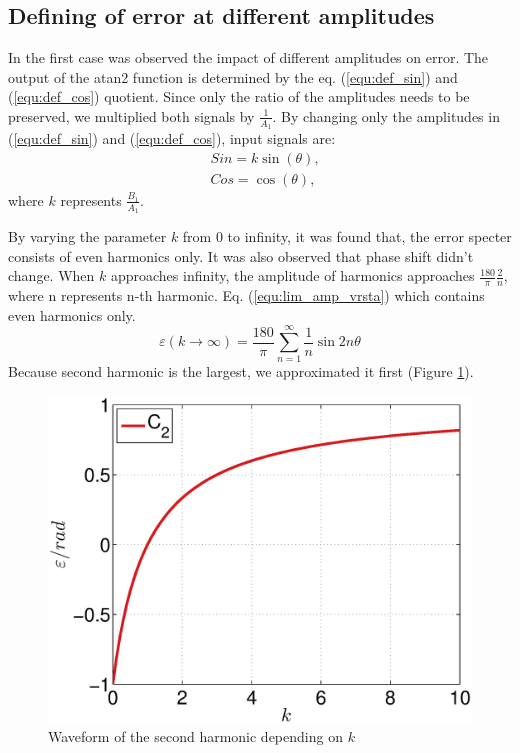 \documentclass[a4paper]{article}
\begin{document}
\subsection{Defining of error at different amplitudes}
In the first case was observed the impact of different amplitudes on error. The output of the atan2 function is determined by the eq. (\ref{equ:def_sin}) and (\ref{equ:def_cos}) quotient. Since only the ratio of the amplitudes needs to be preserved, we multiplied both signals by $\frac{1}{A_1}$. By changing only the amplitudes in (\ref{equ:def_sin}) and (\ref{equ:def_cos}), input signals are:
	\begin{eqnarray}
	\label{equ:def_sin_ama}
	&Sin = k \sin(\theta),\\
	\label{equ:def_cos_amp}
	&Cos =\cos(\theta),
	\end{eqnarray}
where $k$ represents $\frac{B_1}{A_1}$.

By varying the parameter $k$ from 0 to infinity, it was found that, the error specter consists of even harmonics only. It was also observed that phase shift didn't change. When $k$ approaches infinity, the amplitude of harmonics approaches $\frac{180}{\pi}\frac{2}{n}$, where n represents n-th harmonic. Eq. (\ref{equ:lim_amp_vrsta}) which contains even harmonics only.
\begin{equation}
\label{equ:lim_amp_vrsta}
\varepsilon(k \rightarrow \infty) = \frac{180}{\pi}\sum_{n=1}^{\infty}\frac{1}{n} \sin 2 n \theta
\end{equation}
Because second harmonic is the largest, we approximated it first (Figure \ref{fig:amp}).
\begin{figure}[!htb]
	\begin{center}
		\includegraphics[width=\linewidth]{./Slike/amp.eps}
		\caption{Waveform of the second harmonic depending on $k$} \label{fig:amp}
	\end{center}
\end{figure}
\end{document}
